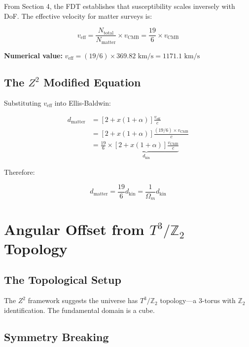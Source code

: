 \documentclass[12pt,a4paper]{article}
\begin{document}
From Section 4, the FDT establishes that susceptibility scales inversely with DoF. The effective velocity for matter surveys is:

\begin{equation}
v_{\text{eff}} = \frac{N_{\text{total}}}{N_{\text{matter}}} \times v_{\text{CMB}} = \frac{19}{6} \times v_{\text{CMB}}
\end{equation}

\textbf{Numerical value:} $v_{\text{eff}} = (19/6) \times 369.82 \text{ km/s} = 1171.1 \text{ km/s}$

\subsection{The $Z^2$ Modified Equation}

Substituting $v_{\text{eff}}$ into Ellis-Baldwin:

\begin{align}
d_{\text{matter}} &= [2 + x(1+\alpha)] \frac{v_{\text{eff}}}{c} \\
&= [2 + x(1+\alpha)] \frac{(19/6) \times v_{\text{CMB}}}{c} \\
&= \frac{19}{6} \times \underbrace{[2 + x(1+\alpha)] \frac{v_{\text{CMB}}}{c}}_{d_{\text{kin}}}
\end{align}

Therefore:

\begin{equation}
\boxed{d_{\text{matter}} = \frac{19}{6} d_{\text{kin}} = \frac{1}{\Omega_m} d_{\text{kin}}}
\end{equation}

\section{Angular Offset from $T^3/\mathbb{Z}_2$ Topology}

\subsection{The Topological Setup}

The $Z^2$ framework suggests the universe has $T^3/\mathbb{Z}_2$ topology---a 3-torus with $\mathbb{Z}_2$ identification. The fundamental domain is a cube.

\subsection{Symmetry Breaking}
\end{document}
